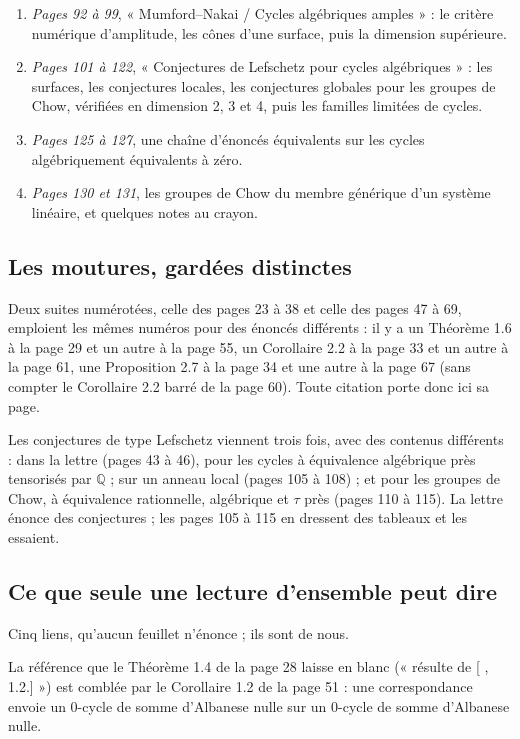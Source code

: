 \documentclass[11pt,a4paper]{article}
\begin{document}
\begin{enumerate}
  \item \emph{Pages 92 à 99}, « Mumford--Nakai / Cycles algébriques amples » :
  le critère numérique d'amplitude, les cônes d'une surface, puis la
  dimension supérieure.
  \item \emph{Pages 101 à 122}, « Conjectures de Lefschetz pour cycles
  algébriques » : les surfaces, les conjectures locales, les conjectures
  globales pour les groupes de Chow, vérifiées en dimension 2, 3 et 4, puis les
  familles limitées de cycles.
  \item \emph{Pages 125 à 127}, une chaîne d'énoncés équivalents sur les cycles
  algébriquement équivalents à zéro.
  \item \emph{Pages 130 et 131}, les groupes de Chow du membre générique d'un
  système linéaire, et quelques notes au crayon.
\end{enumerate}

\subsection*{Les moutures, gardées distinctes}

Deux suites numérotées, celle des pages 23 à 38 et celle des pages 47 à 69,
emploient les mêmes numéros pour des énoncés différents : il y a un Théorème
1.6 à la page 29 et un autre à la page 55, un Corollaire 2.2 à la page 33 et un
autre à la page 61, une Proposition 2.7 à la page 34 et une autre à la page 67
(sans compter le Corollaire 2.2 barré de la page 60). Toute citation porte
donc ici sa page.

Les conjectures de type Lefschetz viennent trois fois, avec des contenus
différents : dans la lettre (pages 43 à 46), pour les cycles à équivalence
algébrique près tensorisés par $\mathbb{Q}$ ; sur un anneau local (pages 105 à
108) ; et pour les groupes de Chow, à équivalence rationnelle, algébrique et
$\tau$ près (pages 110 à 115). La lettre énonce des conjectures ; les pages
105 à 115 en dressent des tableaux et les essaient.

\subsection*{Ce que seule une lecture d'ensemble peut dire}

Cinq liens, qu'aucun feuillet n'énonce ; ils sont de nous.

La référence que le Théorème 1.4 de la page 28 laisse en blanc (« résulte de
[ , 1.2.] ») est comblée par le Corollaire 1.2 de la page 51 : une
correspondance envoie un $0$-cycle de somme d'Albanese nulle sur un $0$-cycle
de somme d'Albanese nulle.
\end{document}
